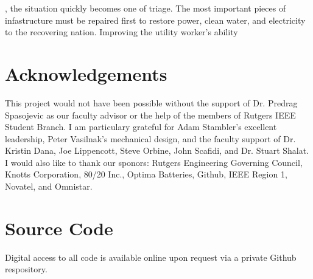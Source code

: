 \documentclass[11pt,twocolumn]{article}
\begin{document}
, the situation quickly becomes one
of triage. The most important pieces of infastructure must be repaired first to
restore power, clean water, and electricity to the recovering nation. Improving
the utility worker's ability 




\section{Acknowledgements}
This project would not have been possible without the support of Dr. Predrag
Spasojevic as our faculty advisor or the help of the members of Rutgers IEEE
Student Branch. I am particulary grateful for Adam Stambler's excellent
leadership, Peter Vasilnak's mechanical design, and the faculty support of Dr.
Kristin Dana, Joe Lippencott, Steve Orbine, John Scafidi, and Dr. Stuart
Shalat. I would also like to thank our sponors: Rutgers Engineering Governing
Council, Knotts Corporation, 80/20 Inc., Optima Batteries, Github, IEEE Region
1, Novatel, and Omnistar.

{}


\appendix
\section{Source Code}
Digital access to all code is available online upon request via a private
Github respository.

\end{document}
